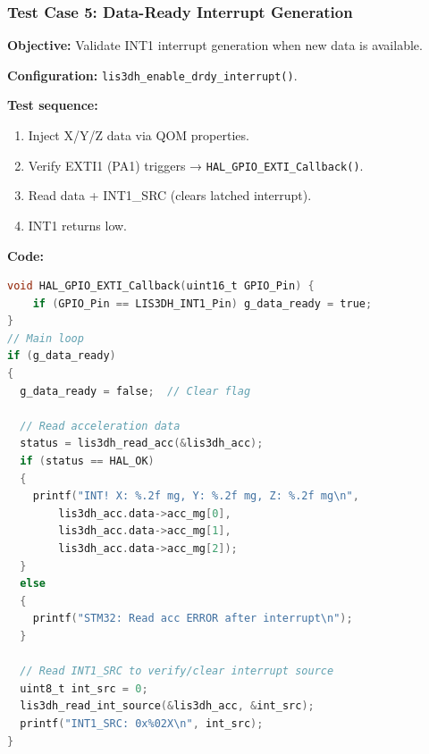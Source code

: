 
\subsubsection{Test Case 5: Data-Ready Interrupt Generation}
\textbf{Objective:} Validate INT1 interrupt generation when new data is available.

\textbf{Configuration:} \texttt{lis3dh\_enable\_drdy\_interrupt()}.

\textbf{Test sequence:}
\begin{enumerate}
  \item Inject X/Y/Z data via QOM properties.
  \item Verify EXTI1 (PA1) triggers → \texttt{HAL\_GPIO\_EXTI\_Callback()}.
  \item Read data + INT1\_SRC (clears latched interrupt).
  \item INT1 returns low.
\end{enumerate}

\textbf{Code:}
\begin{lstlisting}[language=C, caption={Data-Ready interrupt handling}, 
label={code:testcase5}]
void HAL_GPIO_EXTI_Callback(uint16_t GPIO_Pin) {
    if (GPIO_Pin == LIS3DH_INT1_Pin) g_data_ready = true;
}
// Main loop
if (g_data_ready)
{
  g_data_ready = false;  // Clear flag

  // Read acceleration data
  status = lis3dh_read_acc(&lis3dh_acc);
  if (status == HAL_OK)
  {
    printf("INT! X: %.2f mg, Y: %.2f mg, Z: %.2f mg\n",
        lis3dh_acc.data->acc_mg[0],
        lis3dh_acc.data->acc_mg[1],
        lis3dh_acc.data->acc_mg[2]);
  }
  else
  {
    printf("STM32: Read acc ERROR after interrupt\n");
  }

  // Read INT1_SRC to verify/clear interrupt source
  uint8_t int_src = 0;
  lis3dh_read_int_source(&lis3dh_acc, &int_src);
  printf("INT1_SRC: 0x%02X\n", int_src);
}
\end{lstlisting}




























